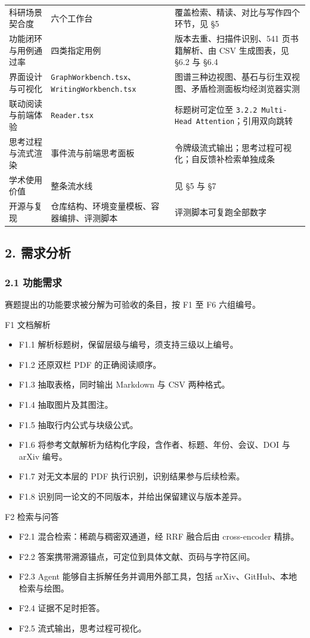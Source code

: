 \documentclass[UTF8,fontset=windows,zihao=5,a4paper]{ctexart}
\begin{document}
\begin{longtable}{@{}p{}p{}p{}@{}}
科研场景契合度 & 六个工作台 & 覆盖检索、精读、对比与写作四个环节，见 §5 \\
功能闭环与用例通过率 & 四类指定用例 & 版本去重、扫描件识别、541 页书籍解析、由 CSV 生成图表，见 §6.2 与 §6.4 \\
界面设计与可视化 & \texttt{GraphWorkbench.tsx}、\texttt{WritingWorkbench.tsx} & 图谱三种边视图、基石与衍生双视图、矛盾检测面板均经浏览器实测 \\
联动阅读与前端体验 & \texttt{Reader.tsx} & 标题树可定位至 \texttt{3.2.2 Multi-Head Attention}；引用双向跳转 \\
思考过程与流式渲染 & 事件流与前端思考面板 & 令牌级流式输出；思考过程可视化；自反馈补检索单独成条 \\
学术使用价值 & 整条流水线 & 见 §5 与 §7 \\
开源与复现 & 仓库结构、环境变量模板、容器编排、评测脚本 & 评测脚本可复跑全部数字 \\
\end{longtable}

\subsection*{2. 需求分析}
\subsubsection*{2.1 功能需求}
赛题提出的功能要求被分解为可验收的条目，按 F1 至 F6 六组编号。

F1 文档解析

\begin{itemize}
\item F1.1 解析标题树，保留层级与编号，须支持三级以上编号。
\item F1.2 还原双栏 PDF 的正确阅读顺序。
\item F1.3 抽取表格，同时输出 Markdown 与 CSV 两种格式。
\item F1.4 抽取图片及其图注。
\item F1.5 抽取行内公式与块级公式。
\item F1.6 将参考文献解析为结构化字段，含作者、标题、年份、会议、DOI 与 arXiv 编号。
\item F1.7 对无文本层的 PDF 执行识别，识别结果参与后续检索。
\item F1.8 识别同一论文的不同版本，并给出保留建议与版本差异。
\end{itemize}

F2 检索与问答

\begin{itemize}
\item F2.1 混合检索：稀疏与稠密双通道，经 RRF 融合后由 cross-encoder 精排。
\item F2.2 答案携带溯源锚点，可定位到具体文献、页码与字符区间。
\item F2.3 Agent 能够自主拆解任务并调用外部工具，包括 arXiv、GitHub、本地检索与绘图。
\item F2.4 证据不足时拒答。
\item F2.5 流式输出，思考过程可视化。
\end{itemize}
\end{document}
